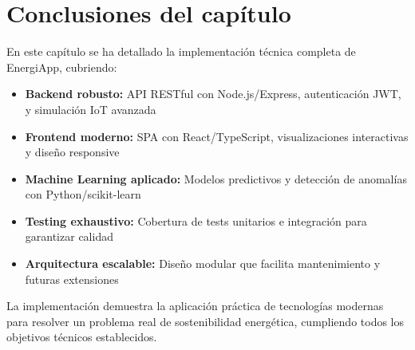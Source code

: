 \section{Conclusiones del capítulo}

En este capítulo se ha detallado la implementación técnica completa de EnergiApp, cubriendo:

\begin{itemize}
    \item \textbf{Backend robusto:} API RESTful con Node.js/Express, autenticación JWT, y simulación IoT avanzada
    \item \textbf{Frontend moderno:} SPA con React/TypeScript, visualizaciones interactivas y diseño responsive
    \item \textbf{Machine Learning aplicado:} Modelos predictivos y detección de anomalías con Python/scikit-learn
    \item \textbf{Testing exhaustivo:} Cobertura de tests unitarios e integración para garantizar calidad
    \item \textbf{Arquitectura escalable:} Diseño modular que facilita mantenimiento y futuras extensiones
\end{itemize}

La implementación demuestra la aplicación práctica de tecnologías modernas para resolver un problema real de sostenibilidad energética, cumpliendo todos los objetivos técnicos establecidos.

